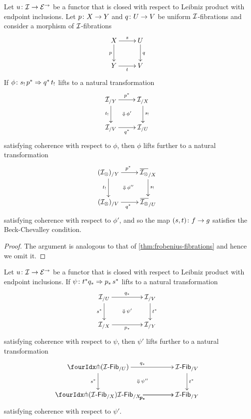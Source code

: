 \documentclass[reqno,10pt,a4paper,oneside,draft]{amsart}
\begin{document}
\begin{theorem} \label{thm:beck-chevalley-unif} Let $u \co \cal{I} \to \cal{E}^\to$ be a functor that is closed with respect to Leibniz product with endpoint
inclusions. Let $p \co X \to Y$ and $q \co U \to V$ be uniform $\cal{I}$-fibrations and consider a morphism of $\cal{I}$-fibrations
\[
\xymatrix{
X \ar[r]^s \ar[d]_{p} & U \ar[d]^{q} \\
Y \ar[r]_t & V}
\]
If  $\phi \co s_! \, p^* \Rightarrow q^* \, t_{!}$ lifts to a natural transformation
\[
\xymatrix{
  \cal{I}_{/Y}
  \ar[r]^{p^*}
  \ar[d]_{t_!}
  \ar@{}[dr]|{\Downarrow \, \phi'}
&
  \cal{I}_{/X}
  \ar[d]^{s_!}
\\
  \cal{I}_{/V}
  \ar[r]_{q^*}
&
  \cal{I}_{/U}
}
\]
satisfying coherence with respect to $\phi$, then $\phi$ lifts further to a natural transformation
\begin{equation*}
\begin{gathered}
\xymatrix{
  (\cal{I}_\otimes)_{/Y}
  \ar[r]^{p^*} 
  \ar[d]_{t_!}
  \ar@{}[dr]|{\Downarrow \, \phi''}
&
  \overline{\cal{I}_\otimes}_{/X}
  \ar[d]^{s_!}
\\
  (\cal{I}_\otimes)_{/V}
  \ar[r]_{q^*} 
&
  \overline{\cal{I}_\otimes}_{/U}
}
\end{gathered}
\end{equation*}
satisfying coherence with respect to $\phi'$, and so the map $(s,t) \co f \to g$ satisfies the Beck-Chevalley
condition.
\end{theorem}

\begin{proof} The argument is analogous to that of \cref{thm:frobenius-fibrations} and hence we omit it.
\end{proof}


\begin{corollary} \label{thm:beck-chevalley-unif-push}
Let $u \co \cal{I} \to \cal{E}^\to$ be a functor that is closed with respect to Leibniz product with endpoint
inclusions. If  $\psi \co t^* q_* \Rightarrow p_* \, s^*$ lifts to a natural transformation 
\[
\xymatrix@C+2em{
  \cal{I}_{/U}
  \ar[r]^{q_*}
  \ar[d]_{s^*}
  \ar@{}[dr]|{\Downarrow \, \psi'}
&
  \cal{I}_{/V}
  \ar[d]^{t^*}
\\
  \cal{I}_{/X}
  \ar[r]_{p_*}
&
  \cal{I}_{/Y}
}
\]
satisfying coherence with respect to $\psi$, then $\psi'$ lifts further to a natural transformation
\[
\xymatrix@C+2em{
  \liftl{(\Fib{\cal{I}}_{/U})}
  \ar[r]^{q_*}
  \ar[d]_{s^*}
  \ar@{}[dr]|{\Downarrow \, \psi''}
&
  \Fib{\cal{I}}_{/V}
  \ar[d]^{t^*}
\\
  \liftl{(\Fib{\cal{I}}_{/X})}
  \ar[r]_{p_*}
  \Fib{\cal{I}}_{/X}
  \ar[r]_{p_*} 
&
  \Fib{\cal{I}}_{/Y}
}
\]
satisfying coherence with respect to $\psi'$.
\end{corollary}
\end{document}
